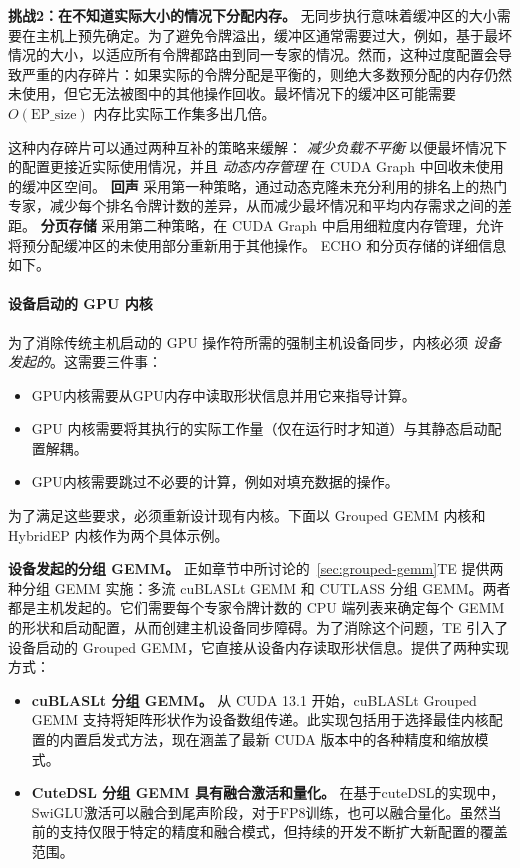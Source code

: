 \documentclass[10pt,logo,copyright]{nvidiatechreport_zh}
\begin{document}
\textbf{挑战2：在不知道实际大小的情况下分配内存。}
无同步执行意味着缓冲区的大小需要在主机上预先确定。为了避免令牌溢出，缓冲区通常需要过大，例如，基于最坏情况的大小，以适应所有令牌都路由到同一专家的情况。然而，这种过度配置会导致严重的内存碎片：如果实际的令牌分配是平衡的，则绝大多数预分配的内存仍然未使用，但它无法被图中的其他操作回收。最坏情况下的缓冲区可能需要 $O(\text{EP\_size})$ 内存比实际工作集多出几倍。

这种内存碎片可以通过两种互补的策略来缓解： \emph{减少负载不平衡} 以便最坏情况下的配置更接近实际使用情况，并且 \emph{动态内存管理} 在 CUDA Graph 中回收未使用的缓冲区空间。 \textbf{回声} 采用第一种策略，通过动态克隆未充分利用的排名上的热门专家，减少每个排名令牌计数的差异，从而减少最坏情况和平均内存需求之间的差距。 \textbf{分页存储} 采用第二种策略，在 CUDA Graph 中启用细粒度内存管理，允许将预分配缓冲区的未使用部分重新用于其他操作。 ECHO 和分页存储的详细信息如下。

\paragraph{设备启动的 GPU 内核}
\label{sec:device-init}

为了消除传统主机启动的 GPU 操作符所需的强制主机设备同步，内核必须 \emph{设备发起的}。这需要三件事：
\begin{itemize}
\item[i.] GPU内核需要从GPU内存中读取形状信息并用它来指导计算。
\item[ii.] GPU 内核需要将其执行的实际工作量（仅在运行时才知道）与其静态启动配置解耦。
\item[iii.] GPU内核需要跳过不必要的计算，例如对填充数据的操作。
\end{itemize}
为了满足这些要求，必须重新设计现有内核。下面以 Grouped GEMM 内核和 HybridEP 内核作为两个具体示例。

\textbf{设备发起的分组 GEMM。}
正如章节中所讨论的~\ref{sec:grouped-gemm}TE 提供两种分组 GEMM 实施：多流 cuBLASLt GEMM 和 CUTLASS 分组 GEMM。两者都是主机发起的。它们需要每个专家令牌计数的 CPU 端列表来确定每个 GEMM 的形状和启动配置，从而创建主机设备同步障碍。为了消除这个问题，TE 引入了设备启动的 Grouped GEMM，它直接从设备内存读取形状信息。提供了两种实现方式：

\begin{itemize}
\item[i.] \textbf{cuBLASLt 分组 GEMM。}
从 CUDA 13.1 开始，cuBLASLt Grouped GEMM 支持将矩阵形状作为设备数组传递。此实现包括用于选择最佳内核配置的内置启发式方法，现在涵盖了最新 CUDA 版本中的各种精度和缩放模式。

\item[ii.] \textbf{CuteDSL 分组 GEMM 具有融合激活和量化。}
在基于cuteDSL的实现中，SwiGLU激活可以融合到尾声阶段，对于FP8训练，也可以融合量化。虽然当前的支持仅限于特定的精度和融合模式，但持续的开发不断扩大新配置的覆盖范围。
\end{itemize}
\end{document}
